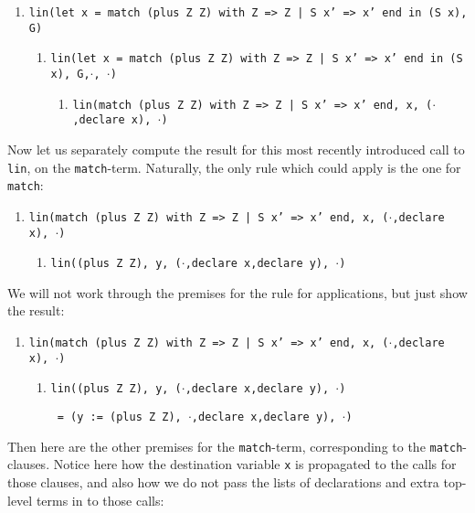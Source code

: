 \documentclass{book}[12pt]
\begin{document}
{\small
\begin{enumerate}
\item \texttt{lin(let x = match (plus Z Z) with Z => Z | S x' => x' end in (S x), G)}
\begin{enumerate}
\item \texttt{lin(let x = match (plus Z Z) with Z => Z | S x' => x' end in (S x), G,}$\cdot$\texttt{, }$\cdot$\texttt{)}
\begin{enumerate}
\item \texttt{lin(match (plus Z Z) with Z => Z | S x' => x' end, x, (}$\cdot$\texttt{,declare x), }$\cdot$\texttt{)}
\end{enumerate}
\end{enumerate}
\end{enumerate}
}

\noindent Now let us separately compute the result for this most
recently introduced call to \texttt{lin}, on the \texttt{match}-term.  Naturally, the only rule
which could apply is the one for \texttt{match}:

{\small
\begin{enumerate}
\item \texttt{lin(match (plus Z Z) with Z => Z | S x' => x' end, x, (}$\cdot$\texttt{,declare x), }$\cdot$\texttt{)}
\begin{enumerate}
\item \texttt{lin((plus Z Z), y, (}$\cdot$\texttt{,declare x,declare y), }$\cdot$\texttt{)}
\end{enumerate}
\end{enumerate}
}

\noindent We will not work through the premises for the rule for applications, but just show the result:

{\small
\begin{enumerate}
\item \texttt{lin(match (plus Z Z) with Z => Z | S x' => x' end, x, (}$\cdot$\texttt{,declare x), }$\cdot$\texttt{)}
\begin{enumerate}
\item \texttt{lin((plus Z Z), y, (}$\cdot$\texttt{,declare x,declare y), }$\cdot$\texttt{)}

\texttt{ = (y := (plus Z Z), }$\cdot$\texttt{,declare x,declare y), }$\cdot$\texttt{)} 
\end{enumerate}
\end{enumerate}
}

\noindent Then here are the other premises for the
\texttt{match}-term, corresponding to the \texttt{match}-clauses.
Notice here how the destination variable \texttt{x} is propagated to
the calls for those clauses, and also how we do not pass the lists of
declarations and extra top-level terms in to those calls:
\end{document}
